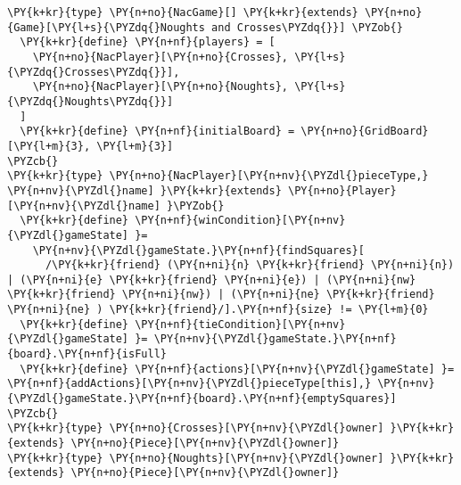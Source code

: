 \begin{Verbatim}[commandchars=\\\{\}]
\PY{k+kr}{type} \PY{n+no}{NacGame}[] \PY{k+kr}{extends} \PY{n+no}{Game}[\PY{l+s}{\PYZdq{}Noughts and Crosses\PYZdq{}}] \PYZob{}
  \PY{k+kr}{define} \PY{n+nf}{players} = [
    \PY{n+no}{NacPlayer}[\PY{n+no}{Crosses}, \PY{l+s}{\PYZdq{}Crosses\PYZdq{}}],
    \PY{n+no}{NacPlayer}[\PY{n+no}{Noughts}, \PY{l+s}{\PYZdq{}Noughts\PYZdq{}}]
  ]
  \PY{k+kr}{define} \PY{n+nf}{initialBoard} = \PY{n+no}{GridBoard}[\PY{l+m}{3}, \PY{l+m}{3}]
\PYZcb{}
\PY{k+kr}{type} \PY{n+no}{NacPlayer}[\PY{n+nv}{\PYZdl{}pieceType,} \PY{n+nv}{\PYZdl{}name] }\PY{k+kr}{extends} \PY{n+no}{Player}[\PY{n+nv}{\PYZdl{}name] }\PYZob{}
  \PY{k+kr}{define} \PY{n+nf}{winCondition}[\PY{n+nv}{\PYZdl{}gameState] }=
    \PY{n+nv}{\PYZdl{}gameState.}\PY{n+nf}{findSquares}[
      /\PY{k+kr}{friend} (\PY{n+ni}{n} \PY{k+kr}{friend} \PY{n+ni}{n}) | (\PY{n+ni}{e} \PY{k+kr}{friend} \PY{n+ni}{e}) | (\PY{n+ni}{nw} \PY{k+kr}{friend} \PY{n+ni}{nw}) | (\PY{n+ni}{ne} \PY{k+kr}{friend} \PY{n+ni}{ne} ) \PY{k+kr}{friend}/].\PY{n+nf}{size} != \PY{l+m}{0}
  \PY{k+kr}{define} \PY{n+nf}{tieCondition}[\PY{n+nv}{\PYZdl{}gameState] }= \PY{n+nv}{\PYZdl{}gameState.}\PY{n+nf}{board}.\PY{n+nf}{isFull}
  \PY{k+kr}{define} \PY{n+nf}{actions}[\PY{n+nv}{\PYZdl{}gameState] }= \PY{n+nf}{addActions}[\PY{n+nv}{\PYZdl{}pieceType[this],} \PY{n+nv}{\PYZdl{}gameState.}\PY{n+nf}{board}.\PY{n+nf}{emptySquares}]
\PYZcb{}
\PY{k+kr}{type} \PY{n+no}{Crosses}[\PY{n+nv}{\PYZdl{}owner] }\PY{k+kr}{extends} \PY{n+no}{Piece}[\PY{n+nv}{\PYZdl{}owner]}
\PY{k+kr}{type} \PY{n+no}{Noughts}[\PY{n+nv}{\PYZdl{}owner] }\PY{k+kr}{extends} \PY{n+no}{Piece}[\PY{n+nv}{\PYZdl{}owner]}
\end{Verbatim}
